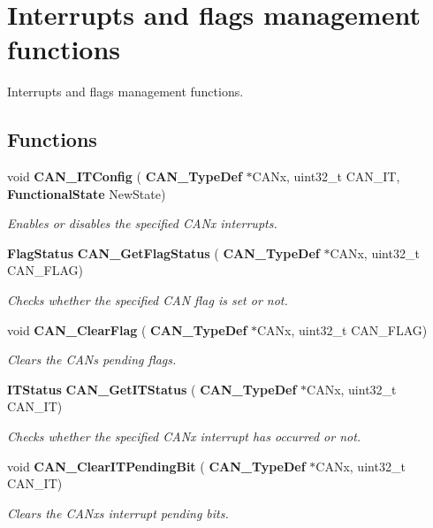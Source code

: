 \section{Interrupts and flags management functions}
\label{group__CAN__Group6}


Interrupts and flags management functions.  


\subsection*{Functions}
\begin{DoxyCompactItemize}
\item 
void \textbf{ C\+A\+N\+\_\+\+I\+T\+Config} (\textbf{ C\+A\+N\+\_\+\+Type\+Def} $\ast$C\+A\+Nx, uint32\+\_\+t C\+A\+N\+\_\+\+IT, \textbf{ Functional\+State} New\+State)
\begin{DoxyCompactList}\small\item\em Enables or disables the specified C\+A\+Nx interrupts. \end{DoxyCompactList}\item 
\textbf{ Flag\+Status} \textbf{ C\+A\+N\+\_\+\+Get\+Flag\+Status} (\textbf{ C\+A\+N\+\_\+\+Type\+Def} $\ast$C\+A\+Nx, uint32\+\_\+t C\+A\+N\+\_\+\+F\+L\+AG)
\begin{DoxyCompactList}\small\item\em Checks whether the specified C\+AN flag is set or not. \end{DoxyCompactList}\item 
void \textbf{ C\+A\+N\+\_\+\+Clear\+Flag} (\textbf{ C\+A\+N\+\_\+\+Type\+Def} $\ast$C\+A\+Nx, uint32\+\_\+t C\+A\+N\+\_\+\+F\+L\+AG)
\begin{DoxyCompactList}\small\item\em Clears the C\+AN\textquotesingle{}s pending flags. \end{DoxyCompactList}\item 
\textbf{ I\+T\+Status} \textbf{ C\+A\+N\+\_\+\+Get\+I\+T\+Status} (\textbf{ C\+A\+N\+\_\+\+Type\+Def} $\ast$C\+A\+Nx, uint32\+\_\+t C\+A\+N\+\_\+\+IT)
\begin{DoxyCompactList}\small\item\em Checks whether the specified C\+A\+Nx interrupt has occurred or not. \end{DoxyCompactList}\item 
void \textbf{ C\+A\+N\+\_\+\+Clear\+I\+T\+Pending\+Bit} (\textbf{ C\+A\+N\+\_\+\+Type\+Def} $\ast$C\+A\+Nx, uint32\+\_\+t C\+A\+N\+\_\+\+IT)
\begin{DoxyCompactList}\small\item\em Clears the C\+A\+Nx\textquotesingle{}s interrupt pending bits. \end{DoxyCompactList}\end{DoxyCompactItemize}


